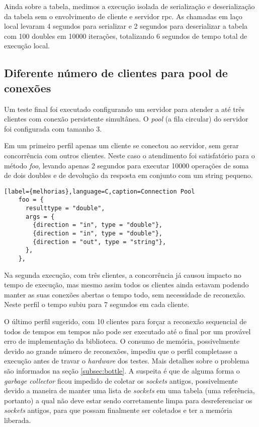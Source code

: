 \documentclass[11pt]{article}
\begin{document}
Ainda sobre a tabela, medimos a execução isolada de serialização e
deserialização da tabela sem o envolvimento de cliente e servidor \gls{rpc}. As
chamadas em laço local levaram 4 segundos para serializar e 2 segundos para
deserializar a tabela com 100 doubles em 10000 iterações, totalizando 6 segundos
de tempo total de execução local.

\subsection{Diferente número de clientes para pool de conexões}\label{subsec:diffpool}

Um teste final foi executado configurando um servidor para atender a até três
clientes com conexão persistente simultânea. O \textit{pool} (a fila circular)
do servidor foi configurada com tamanho 3.

Em um primeiro perfil apenas um cliente se conectou ao servidor, sem gerar
concorrência com outros clientes. Neste caso o atendimento foi satisfatório para
o método \textit{foo}, levando apenas 2 segundos para executar 10000 operações
de soma de dois doubles e de devolução da resposta em conjunto com um string
pequeno.

\begin{lstlisting}[label={melhorias},language=C,caption=Connection Pool
    foo = {
      resulttype = "double",
      args = {
        {direction = "in", type = "double"},
        {direction = "in", type = "double"},
        {direction = "out", type = "string"},
      },
    },
\end{lstlisting}

Na segunda execução, com três clientes, a concorrência já causou impacto no
tempo de execução, mas mesmo assim todos os clientes ainda estavam podendo
manter as suas conexões abertas o tempo todo, sem necessidade de reconexão.
Neste perfil o tempo subiu para 7 segundos em cada cliente.

O último perfil sugerido, com 10 clientes para forçar a reconexão sequencial de
todos de tempos em tempos não pode ser executado até o final por um provável
erro de implementação da biblioteca. O consumo de memória, possivelmente devido
ao grande número de reconexões, impediu que o perfil completasse a execução
antes de travar o \textit{hardware} dos testes. Mais detalhes sobre o problema
são informados na seção \ref{subsec:bottle}. A suspeita é que de alguma forma o
\textit{garbage collector} ficou impedido de coletar os \textit{sockets}
antigos, possivelmente devido a maneira de manter uma lista de \textit{sockets}
em uma tabela (uma referência, portanto) a qual não deve estar sendo
corretamente limpa para desreferenciar os \textit{sockets} antigos, para que
possam finalmente ser coletados e ter a memória liberada.
\end{document}
